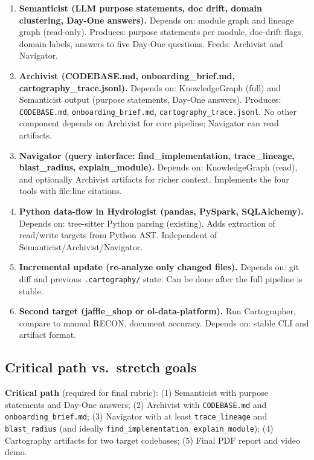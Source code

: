 \documentclass[11pt,a4paper]{article}
\begin{document}
\begin{enumerate}[leftmargin=*]
  \item \textbf{Semanticist (LLM purpose statements, doc drift, domain clustering, Day-One answers).} Depends on: module graph and lineage graph (read-only). Produces: purpose statements per module, doc-drift flags, domain labels, answers to five Day-One questions. Feeds: Archivist and Navigator.
  \item \textbf{Archivist (CODEBASE.md, onboarding\_brief.md, cartography\_trace.jsonl).} Depends on: KnowledgeGraph (full) and Semanticist output (purpose statements, Day-One answers). Produces: \texttt{CODEBASE.md}, \texttt{onboarding\_brief.md}, \texttt{cartography\_trace.jsonl}. No other component depends on Archivist for core pipeline; Navigator can read artifacts.
  \item \textbf{Navigator (query interface: find\_implementation, trace\_lineage, blast\_radius, explain\_module).} Depends on: KnowledgeGraph (read), and optionally Archivist artifacts for richer context. Implements the four tools with file:line citations.
  \item \textbf{Python data-flow in Hydrologist (pandas, PySpark, SQLAlchemy).} Depends on: tree-sitter Python parsing (existing). Adds extraction of read/write targets from Python AST. Independent of Semanticist/Archivist/Navigator.
  \item \textbf{Incremental update (re-analyze only changed files).} Depends on: git diff and previous \texttt{.cartography/} state. Can be done after the full pipeline is stable.
  \item \textbf{Second target (jaffle\_shop or ol-data-platform).} Run Cartographer, compare to manual RECON, document accuracy. Depends on: stable CLI and artifact format.
\end{enumerate}

\subsection{Critical path vs.\ stretch goals}

\textbf{Critical path} (required for final rubric): (1) Semanticist with purpose statements and Day-One answers; (2) Archivist with \texttt{CODEBASE.md} and \texttt{onboarding\_brief.md}; (3) Navigator with at least \texttt{trace\_lineage} and \texttt{blast\_radius} (and ideally \texttt{find\_implementation}, \texttt{explain\_module}); (4) Cartography artifacts for two target codebases; (5) Final PDF report and video demo.
\end{document}
